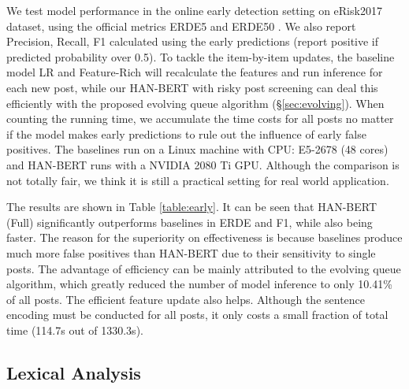 We test model performance in the online early detection setting on eRisk2017 dataset, using the official metrics ERDE5 and ERDE50 \citep{losada2017erisk}. We also report Precision, Recall, F1 calculated using the early predictions (report positive if predicted probability over 0.5). To tackle the item-by-item updates, the baseline model LR and Feature-Rich will recalculate the features and run inference for each new post, while our HAN-BERT with risky post screening can deal this efficiently with the proposed evolving queue algorithm (\S \ref{sec:evolving}). When counting the running time, we accumulate the time costs for all posts no matter if the model makes early predictions to rule out the influence of early false positives. The baselines run on a Linux machine with CPU: E5-2678 (48 cores) and HAN-BERT runs with a NVIDIA 2080 Ti GPU. Although the comparison is not totally fair, we think it is still a practical setting for real world application.

The results are shown in Table \ref{table:early}. It can be seen that HAN-BERT (Full) significantly outperforms baselines in ERDE and F1, while also being faster. The reason for the superiority on effectiveness is because baselines produce much more false positives than HAN-BERT due to their sensitivity to single posts. The advantage of efficiency can be mainly attributed to the evolving queue algorithm, which greatly reduced the number of model inference to only 10.41\% of all posts. The efficient feature update also helps. Although the sentence encoding must be conducted for all posts, it only costs a small fraction of total time (114.7s out of 1330.3s). 


\subsection{Lexical Analysis}

